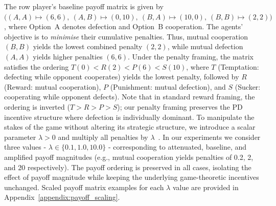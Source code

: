 \documentclass[a4paper,fleqn]{cas-sc}
\begin{document}
The row player's baseline payoff matrix is given by
$\bigl((A,A)\!\mapsto\!(6,6),\ (A,B)\!\mapsto\!(0,10),\ (B,A)\!\mapsto\!(10,0),\ (B,B)\!\mapsto\!(2,2)\bigr)$,
where Option~A denotes defection and Option~B cooperation. The agents' objective is to \emph{minimise} their cumulative penalties. Thus, mutual cooperation $(B,B)$ yields the lowest combined penalty $(2,2)$, while mutual defection $(A,A)$ yields higher penalties $(6,6)$. Under the penalty framing, the matrix satisfies the ordering $T(0) < R(2) < P(6) < S(10)$, where $T$ (Temptation: defecting while opponent cooperates) yields the lowest penalty, followed by $R$ (Reward: mutual cooperation), $P$ (Punishment: mutual defection), and $S$ (Sucker: cooperating while opponent defects). Note that in standard reward framing, the ordering is inverted ($T > R > P > S$); our penalty framing preserves the PD incentive structure where defection is individually dominant. To manipulate the stakes of the game without altering its strategic structure, we introduce a scalar parameter $\lambda > 0$ and multiply all penalties by $\lambda$~\cite{han_when_2021}. In our experiments we consider three values - $\lambda \in \{0.1, 1.0, 10.0\}$ - corresponding to attenuated, baseline, and amplified payoff magnitudes (e.g., mutual cooperation yields penalties of 0.2, 2, and 20 respectively). The payoff ordering is preserved in all cases, isolating the effect of payoff magnitude while keeping the underlying game-theoretic incentives unchanged. Scaled payoff matrix examples for each $\lambda$ value are provided in Appendix~\ref{appendix:payoff_scaling}.
\end{document}
